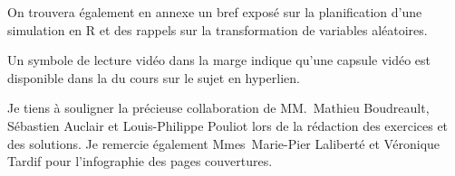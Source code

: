 On trouvera également en annexe un bref exposé sur la planification
d'une simulation en R et des rappels sur la transformation de
variables aléatoires.

Un symbole de lecture vidéo dans la marge indique qu'une capsule vidéo
est disponible dans la %
du cours sur le sujet en hyperlien.

Je tiens à souligner la précieuse collaboration de MM.~Mathieu
Boudreault, Sébastien Auclair et Louis-Philippe Pouliot lors de la
rédaction des exercices et des solutions. Je remercie également
Mmes~Marie-Pier Laliberté et Véronique Tardif pour l'infographie des
pages couvertures.

